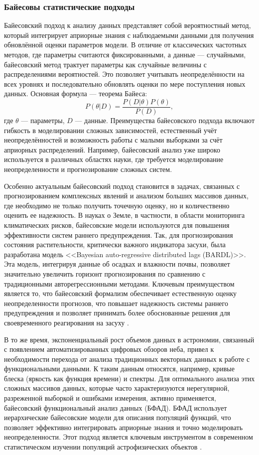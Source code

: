 \documentclass[a4paper]{article}
\begin{document}
\subsubsection{Байесовы статистические подходы}
Байесовский подход к анализу данных представляет собой вероятностный метод, который интегрирует априорные знания с наблюдаемыми данными для получения обновлённой оценки параметров модели. В отличие от классических частотных методов, где параметры считаются фиксированными, а данные — случайными, байесовский метод трактует параметры как случайные величины с распределениями вероятностей. Это позволяет учитывать неопределённости на всех уровнях и последовательно обновлять оценки по мере поступления новых данных. Основная формула — теорема Байеса:
\begin{equation}
    P(\theta | D) = \frac{P(D | \theta) P(\theta)}{P(D)}, 
\end{equation}
где $\theta$ — параметры, $D$ — данные.
Преимущества байесовского подхода включают гибкость в моделировании сложных зависимостей, естественный учёт неопределённостей и возможность работы с малыми выборками за счёт априорных распределений. Например, байесовский анализ уже широко используется в различных областях науки, где требуется моделирование неопределенности и прогнозирование сложных систем.

Особенно актуальным байесовский подход становится в задачах, связанных с прогнозированием комплексных явлений и анализом больших массивов данных, где необходимо не только получить точечную оценку, но и количественно оценить ее надежность. В науках о Земле, в частности, в области мониторинга климатических рисков, байесовские модели используются для повышения эффективности систем раннего предупреждения. Так, для прогнозирования состояния растительности, критически важного индикатора засухи, была разработана модель <<Bayesian auto-regressive distributed lags (BARDL)>>. Эта модель, интегрируя данные об осадках и влажности почвы, позволяет значительно увеличить горизонт прогнозирования по сравнению с традиционными авторегрессионными методами. Ключевым преимуществом является то, что байесовский формализм обеспечивает естественную оценку неопределенности прогнозов, что повышает надежность системы раннего предупреждения и позволяет принимать более обоснованные решения для своевременного реагирования на засуху \cite{24}.

В то же время, экспоненциальный рост объемов данных в астрономии, связанный с появлением автоматизированных цифровых обзоров неба, привел к необходимости перехода от анализа традиционных векторных данных к работе с функциональными данными. К таким данным относятся, например, кривые блеска (яркость как функция времени) и спектры. Для оптимального анализа этих сложных массивов данных, которые часто характеризуются нерегулярной, разреженной выборкой и ошибками измерения, активно применяется, байесовский функциональный анализ данных (БФАД). БФАД использует иерархические байесовские модели для описания популяций функций, что позволяет эффективно интегрировать априорные знания и точно моделировать неопределенности. Этот подход является ключевым инструментом в современном статистическом изучении популяций астрофизических объектов \cite{25}.
\end{document}
